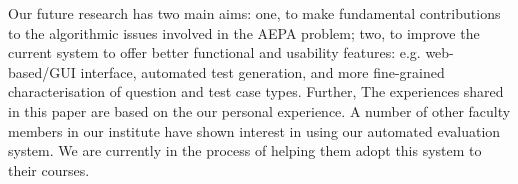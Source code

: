 \documentclass[sigconf]{acmart}
\begin{document}
Our future research has two main aims: one, to make fundamental contributions to the algorithmic issues involved in the AEPA problem; two, to improve the current system to offer better functional and usability features: e.g. web-based/GUI interface, automated test generation, and more fine-grained characterisation of question and test case types. Further, The experiences shared in this paper are based on the our personal experience. A number of other faculty members in our institute have shown interest in using our automated evaluation system. We are currently in the process of helping them adopt this system to their courses.




\end{document}
